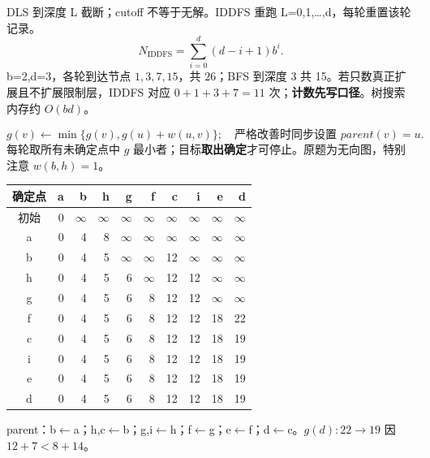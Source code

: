 DLS 到深度 L 截断；cutoff 不等于无解。IDDFS 重跑 L=0,1,…,d，每轮重置该轮记录。
\[
N_{\mathrm{IDDFS}}=\sum_{i=0}^d(d-i+1)b^i.
\]
b=2,d=3，各轮到达节点 $1,3,7,15$，共 $26$；BFS 到深度 3 共 15。若只数真正扩展且不扩展限制层，IDDFS 对应 $0+1+3+7=11$ 次；\textbf{计数先写口径}。树搜索内存约 $O(bd)$。

\label{ex:dijkstra}
\[
g(v)\leftarrow\min\{g(v),g(u)+w(u,v)\};\quad
\text{严格改善时同步设置 }parent(v)=u.
\]
每轮取所有未确定点中 $g$ 最小者；目标\textbf{取出确定}才可停止。原题为无向图，特别注意 $w(b,h)=1$。
\begin{center}\small\begin{tabular}{c|rrrrrrrrr}\toprule
确定点&a&b&h&g&f&c&i&e&d\\\midrule
初始&0&$\infty$&$\infty$&$\infty$&$\infty$&$\infty$&$\infty$&$\infty$&$\infty$\\
a&0&4&8&$\infty$&$\infty$&$\infty$&$\infty$&$\infty$&$\infty$\\
b&0&4&5&$\infty$&$\infty$&12&$\infty$&$\infty$&$\infty$\\
h&0&4&5&6&$\infty$&12&12&$\infty$&$\infty$\\
g&0&4&5&6&8&12&12&$\infty$&$\infty$\\
f&0&4&5&6&8&12&12&18&22\\
c&0&4&5&6&8&12&12&18&19\\
i&0&4&5&6&8&12&12&18&19\\
e&0&4&5&6&8&12&12&18&19\\
d&0&4&5&6&8&12&12&18&19\\\bottomrule
\end{tabular}\end{center}
parent：b$\leftarrow$a；h,c$\leftarrow$b；g,i$\leftarrow$h；f$\leftarrow$g；e$\leftarrow$f；d$\leftarrow$c。$g(d):22\to19$ 因 $12+7<8+14$。
